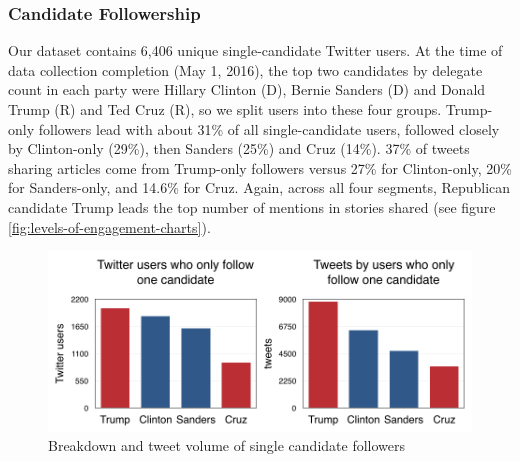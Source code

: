 \documentclass[letterpaper]{article}
\begin{document}
\subsubsection{Candidate Followership}
Our dataset contains 6,406 unique single-candidate Twitter users. At the time of data collection completion (May 1, 2016), the top two candidates by delegate count in each party were Hillary Clinton (D), Bernie Sanders (D) and Donald Trump (R) and Ted Cruz (R), so we split users into these four groups. Trump-only followers lead with about 31\% of all single-candidate users, followed closely by Clinton-only (29\%), then Sanders (25\%) and Cruz (14\%). 37\% of tweets sharing articles come from Trump-only followers versus 27\% for Clinton-only, 20\% for Sanders-only, and 14.6\% for Cruz. Again, across all four segments, Republican candidate Trump leads the top number of mentions in stories shared (see figure \ref{fig:levels-of-engagement-charts}).


\begin{figure}[t!]  
\centering 
  \includegraphics[width=\columnwidth]{single-candid-charts}  
   \caption{Breakdown and tweet volume of single candidate followers
     \label{fig:single-candid-stats}}
\end{figure} 
 
\end{document}
